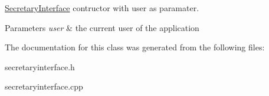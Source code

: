 \mbox{\hyperlink{class_secretary_interface}{Secretary\+Interface}} contructor with user as paramater. 


\begin{DoxyParams}{Parameters}
{\em user} & the current user of the application \\
\hline
\end{DoxyParams}


The documentation for this class was generated from the following files\+:\begin{DoxyCompactItemize}
\item 
secretaryinterface.\+h\item 
secretaryinterface.\+cpp\end{DoxyCompactItemize}
